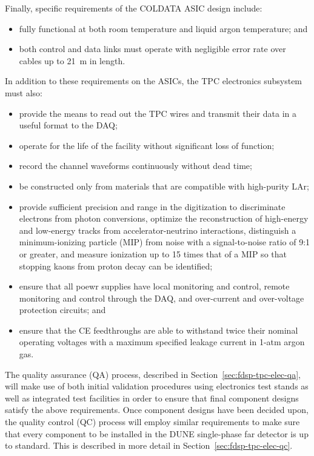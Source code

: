 Finally, specific requirements of the COLDATA ASIC design include:
\begin{itemize}
\item{fully functional at both room temperature and liquid argon temperature; and}
\item{both control and data links must operate with negligible error rate over cables up to 21~m in length.}
\end{itemize}

In addition to these requirements on the ASICs, the TPC electronics subsystem must also:
\begin{itemize}
\item{provide the means to read out the TPC wires and transmit their data in a useful format to the DAQ;}
\item{operate for the life of the facility without significant loss of function;}
\item{record the channel waveforms continuously without dead time;}
\item{be constructed only from materials that are compatible with high-purity LAr;}
\item{provide sufficient precision and range in the digitization to discriminate electrons from photon conversions, optimize the reconstruction of high-energy and low-energy tracks from accelerator-neutrino interactions, distinguish a minimum-ionizing particle (MIP) from noise with a signal-to-noise ratio of 9:1 or greater, and measure ionization up to 15 times that of a MIP so that stopping kaons from proton decay can be identified;}
\item{ensure that all poewr supplies have local monitoring and control, remote monitoring and control through the DAQ, and over-current and over-voltage protection circuits; and}
\item{ensure that the CE feedthroughs are able to withstand twice their nominal operating voltages with a maximum specified leakage current in 1-atm argon gas.}
\end{itemize}

The quality assurance (QA) process, described in Section~\ref{sec:fdsp-tpc-elec-qa}, will make use of both initial validation procedures using electronics test stands as well as integrated test facilities in order to ensure that final component designs satisfy the above requirements.  Once component designs have been decided upon, the quality control (QC) process will employ similar requirements to make sure that every component to be installed in the DUNE single-phase far detector is up to standard.  This is described in more detail in Section~\ref{sec:fdsp-tpc-elec-qc}.
